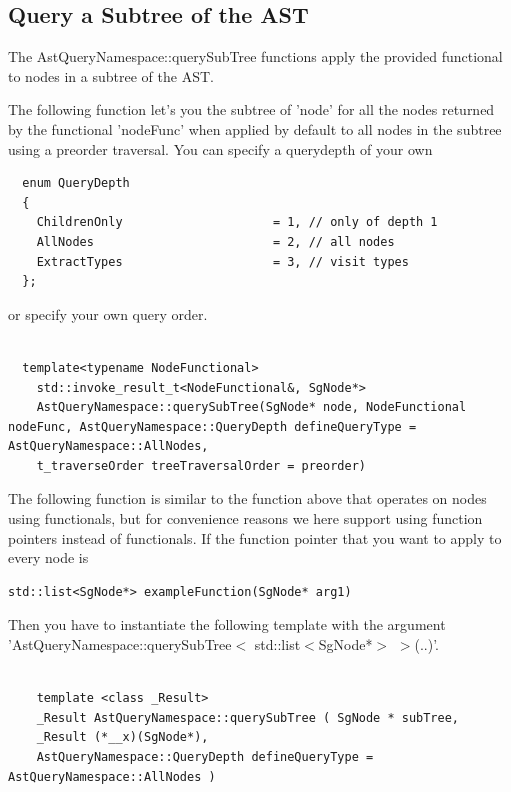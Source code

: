 \subsection{Query a Subtree of the AST}

The AstQueryNamespace::querySubTree functions apply the provided functional to nodes in a subtree of the AST.


The following function let's you the subtree of 'node' for all the nodes returned by the functional 'nodeFunc'
when applied by default to all nodes in the subtree using a preorder traversal. You can specify a querydepth of
your own 
\begin{verbatim}
  enum QueryDepth
  {
    ChildrenOnly                     = 1, // only of depth 1
    AllNodes                         = 2, // all nodes
    ExtractTypes                     = 3, // visit types
  };
\end{verbatim}
or specify your own query order.
\begin{verbatim}

  template<typename NodeFunctional>
    std::invoke_result_t<NodeFunctional&, SgNode*>
    AstQueryNamespace::querySubTree(SgNode* node, NodeFunctional nodeFunc, AstQueryNamespace::QueryDepth defineQueryType = AstQueryNamespace::AllNodes,
	t_traverseOrder treeTraversalOrder = preorder)
\end{verbatim}

The following function is similar to the function above that operates on nodes using functionals, but for convenience
reasons we here support using function pointers instead of functionals. If the function pointer that you want to apply
to every node is
\begin{verbatim}
std::list<SgNode*> exampleFunction(SgNode* arg1) 
\end{verbatim}
Then you have to instantiate the following template with the argument 'AstQueryNamespace::querySubTree$<$ std::list$<$SgNode*$>$ $>$(..)'.
\begin{verbatim}

    template <class _Result> 
    _Result AstQueryNamespace::querySubTree ( SgNode * subTree,
	_Result (*__x)(SgNode*),
	AstQueryNamespace::QueryDepth defineQueryType = AstQueryNamespace::AllNodes )
\end{verbatim}

